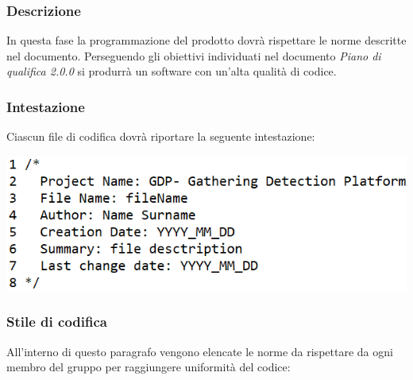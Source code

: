 \subsubsection{Descrizione}\label{ProcessiPrimariCodificaDescrizione}
In questa fase la programmazione del prodotto dovrà rispettare le norme descritte nel documento. Perseguendo gli obiettivi individuati nel documento \textit{Piano di qualifica 2.0.0} si produrrà un software con un'alta qualità di codice.

\subsubsection{Intestazione} \label{ProcessiPrimariCodificaIntestazione}
Ciascun file di codifica dovrà riportare la seguente intestazione:
\begin{center}
	\includegraphics[width=0.5\linewidth]{../immagini/IntestazioneNorme.png}
\end{center}


\subsubsection{Stile di codifica}\label{ProcessiPrimariCodificaStileDiCodifica}
All'interno di questo paragrafo vengono elencate le norme da rispettare da ogni membro del gruppo per raggiungere uniformità del codice:

